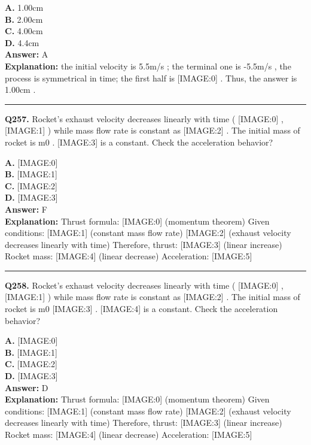 \documentclass[12pt]{article}
\begin{document}
\textbf{A.} 1.00cm \\
\textbf{B.} 2.00cm \\
\textbf{C.} 4.00cm \\
\textbf{D.} 4.4cm \\

\textbf{Answer:} A \\
\textbf{Explanation:} the initial velocity is 5.5m/s
; the terminal one is -5.5m/s
, the process is symmetrical in time; the first half is
[IMAGE:0]
. Thus, the answer is 1.00cm
.

\hrule
\vspace{1em}


\noindent
\textbf{Q257.} Rocket's exhaust velocity decreases linearly with time (
[IMAGE:0]
,
[IMAGE:1]
) while mass flow rate is constant as
[IMAGE:2]
. The initial mass of rocket is m0
.
[IMAGE:3]
is a constant.
Check the acceleration behavior?



\textbf{A.} [IMAGE:0] \\
\textbf{B.} [IMAGE:1] \\
\textbf{C.} [IMAGE:2] \\
\textbf{D.} [IMAGE:3] \\

\textbf{Answer:} F \\
\textbf{Explanation:} Thrust formula:
[IMAGE:0]
(momentum theorem)
Given conditions:
[IMAGE:1]
(constant mass flow rate)
[IMAGE:2]
(exhaust velocity decreases linearly with time)
Therefore, thrust:
[IMAGE:3]
(linear increase)
Rocket mass:
[IMAGE:4]
(linear decrease)
Acceleration:
[IMAGE:5]

\hrule
\vspace{1em}


\noindent
\textbf{Q258.} Rocket's exhaust velocity decreases linearly with time (
[IMAGE:0]
,
[IMAGE:1]
) while mass flow rate is constant as
[IMAGE:2]
. The initial mass of rocket is m0
[IMAGE:3]
.
[IMAGE:4]
is a constant.
Check the acceleration behavior?



\textbf{A.} [IMAGE:0] \\
\textbf{B.} [IMAGE:1] \\
\textbf{C.} [IMAGE:2] \\
\textbf{D.} [IMAGE:3] \\

\textbf{Answer:} D \\
\textbf{Explanation:} Thrust formula:
[IMAGE:0]
(momentum theorem)
Given conditions:
[IMAGE:1]
(constant mass flow rate)
[IMAGE:2]
(exhaust velocity decreases linearly with time)
Therefore, thrust:
[IMAGE:3]
(linear increase)
Rocket mass:
[IMAGE:4]
(linear decrease)
Acceleration:
[IMAGE:5]
\end{document}
